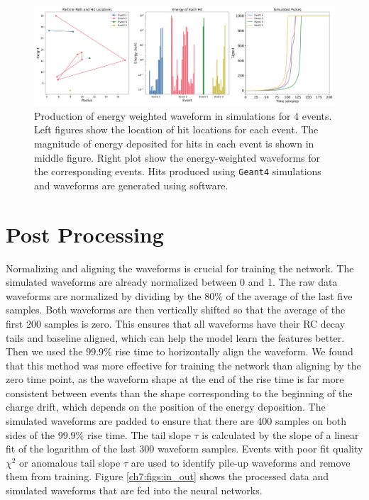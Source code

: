 \begin{figure}[htb!]
    \includegraphics[width=0.99\linewidth,trim={1pc 0pc 1pc 0pc},clip]{ch7/figs/hit_sims.pdf}
    \caption{Production of energy weighted waveform in simulations for 4 events. Left figures show the location of hit locations for each event.  The magnitude of energy deposited for hits in each event is shown in middle figure. Right plot show the energy-weighted waveforms for the corresponding events. Hits produced using \texttt{Geant4} simulations and waveforms are generated using {\siggen} software.}
   \label{ch7_fig_eng_dep_sim}
\end{figure}

\section{Post Processing}
Normalizing and aligning the waveforms is crucial for training the network. The simulated waveforms are already normalized between 0 and 1. The raw data waveforms are normalized by dividing by the $80\%$ of the average of the last five samples. Both waveforms are then vertically shifted so that the average of the first 200 samples is zero. This ensures that all waveforms have their RC decay tails and baseline aligned, which can help the model learn the features better. Then we used the $99.9\%$ rise time to horizontally align the waveform. We found that this method was more effective for training the network than aligning by the zero time point, as the waveform shape at the end of the rise time is far more consistent between events than the shape corresponding to the beginning of the charge drift, which depends on the position of the energy deposition. The simulated waveforms are padded to ensure that there are 400 samples on both sides of the $99.9\%$ rise time. The tail slope $\tau$ is calculated by the slope of a linear fit of the logarithm of the last 300 waveform samples. Events with poor fit quality $\chi^2$ or anomalous tail slope $\tau$ are used to identify pile-up waveforms and remove them from training. Figure \ref{ch7:figs:in_out} shows the processed data and simulated waveforms that are fed into the neural networks.

